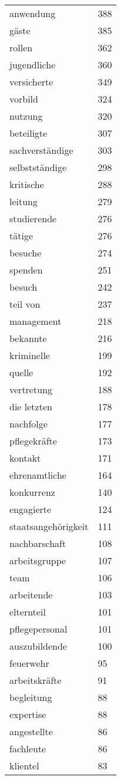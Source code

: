 \begin{tabular}{ll}
anwendung & 388\\
gäste & 385\\
rollen & 362\\
jugendliche & 360\\
versicherte & 349\\
vorbild & 324\\
nutzung & 320\\
beteiligte & 307\\
sachverständige & 303\\
selbstständige & 298\\
kritische & 288\\
leitung & 279\\
studierende & 276\\
tätige & 276\\
besuche & 274\\
spenden & 251\\
besuch & 242\\
teil von & 237\\
management & 218\\
bekannte & 216\\
kriminelle & 199\\
quelle & 192\\
vertretung & 188\\
die letzten & 178\\
nachfolge & 177\\
pflegekräfte & 173\\
kontakt & 171\\
ehrenamtliche & 164\\
konkurrenz & 140\\
engagierte & 124\\
staatsangehörigkeit & 111\\
nachbarschaft & 108\\
arbeitsgruppe & 107\\
team & 106\\
arbeitende & 103\\
elternteil & 101\\
pflegepersonal & 101\\
auszubildende & 100\\
feuerwehr & 95\\
arbeitskräfte & 91\\
begleitung & 88\\
expertise & 88\\
angestellte & 86\\
fachleute & 86\\
klientel & 83\\

\end{tabular}
